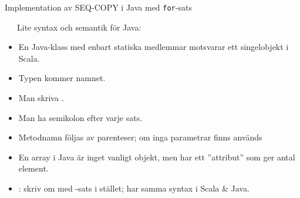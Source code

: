 \begin{Slide}{Implementation av SEQ-COPY i Java med \texttt{for}-sats}
\begin{minipage}{0.55\textwidth}
\vspace{-0.5em}
\end{minipage}
\begin{minipage}{0.44\textwidth}\SlideFontTiny\vspace{-1.5em}\ifkompendium\small\fi
~~~Lite syntax och semantik för Java:
\begin{itemize}
\item En Java-klass med enbart statiska medlemmar motsvarar ett singelobjekt i Scala.

\item Typen kommer  namnet.

\item Man  skriva .

\item Man  ha semikolon efter varje sats.

\item Metodnamn  följas av parenteser; om inga parametrar finns används \code{()}

\item En array i Java är inget vanligt objekt, men har ett ''attribut''  som ger antal element.

\item {}: skriv om med -sats i stället; har samma syntax i Scala \& Java.

\end{itemize}
\end{minipage}

\end{Slide}
  


